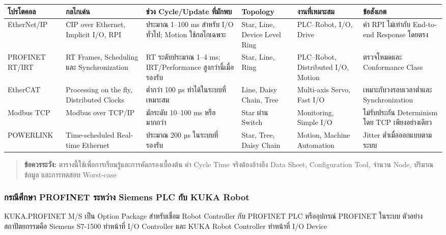 \begin{table}[htbp]
    \centering
    \small
    \begin{tabularx}{\textwidth}{@{}L{0.13\textwidth} X X L{0.13\textwidth} X X@{}}
        \hline
        \textbf{โปรโตคอล} & \textbf{กลไกเด่น} & \textbf{ช่วง Cycle/Update ที่มักพบ} & \textbf{Topology} & \textbf{งานที่เหมาะสม} & \textbf{ข้อสังเกต} \\
        \hline
        EtherNet/IP & CIP over Ethernet, Implicit I/O, RPI & ประมาณ 1–100 ms สำหรับ I/O ทั่วไป; Motion ใช้กลไกเฉพาะ & Star, Line, Device Level Ring & PLC–Robot, I/O, Drive & ค่า RPI ไม่เท่ากับ End-to-end Response โดยตรง \\
        PROFINET RT/IRT & RT Frames, Scheduling และ Synchronization & RT ระดับประมาณ 1–4 ms; IRT/Performance สูงกว่านี้เมื่อรองรับ & Star, Line, Ring & PLC–Robot, Distributed I/O, Motion & ตรวจโหมดและ Conformance Class \\
        EtherCAT & Processing on the fly, Distributed Clocks & ต่ำกว่า 100 µs ทำได้ในระบบที่เหมาะสม & Line, Daisy Chain, Tree & Multi-axis Servo, Fast I/O & เหมาะกับวงรอบเวลาต่ำและ Synchronization \\
        Modbus TCP & Modbus over TCP/IP & มักระดับ 10–100 ms หรือมากกว่า & Star ผ่าน Switch & Monitoring, Simple I/O & ไม่รับประกัน Determinism โดย TCP เพียงอย่างเดียว \\
        POWERLINK & Time-scheduled Real-time Ethernet & ประมาณ 200 µs ในระบบที่รองรับ & Star, Tree, Daisy Chain & Motion, Machine Automation & Jitter ต่ำเมื่อออกแบบตามระบบ \\
        \hline
    \end{tabularx}
\end{table}

\begin{quote}
\textbf{ข้อควรระวัง:} ตารางนี้ใช้เพื่อการเรียนรู้และการคัดกรองเบื้องต้น ค่า Cycle Time จริงต้องอ้างอิง Data Sheet, Configuration Tool, จำนวน Node, ปริมาณข้อมูล และการทดสอบ Worst-case
\end{quote}

\newpage

\subsubsection{กรณีศึกษา PROFINET ระหว่าง Siemens PLC กับ KUKA Robot}

KUKA.PROFINET M/S เป็น Option Package สำหรับเชื่อม Robot Controller กับ PROFINET PLC หรืออุปกรณ์ PROFINET ในระบบ ตัวอย่างสถาปัตยกรรมคือ Siemens S7-1500 ทำหน้าที่ I/O Controller และ KUKA Robot Controller ทำหน้าที่ I/O Device

